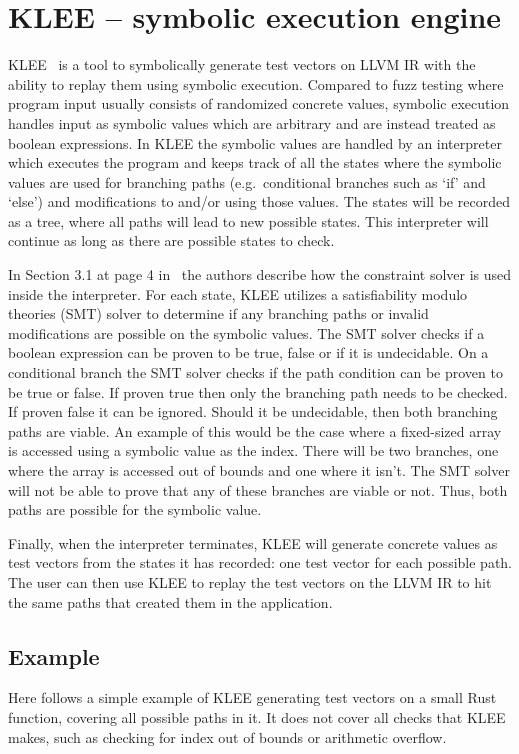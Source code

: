 \section{KLEE -- symbolic execution engine}
KLEE~\cite{kleepaper} is a tool to symbolically generate test vectors on LLVM IR with the
ability to replay them using symbolic execution. Compared to fuzz testing
where program input usually consists of randomized concrete values, symbolic
execution handles input as symbolic values which are arbitrary and are instead
treated as boolean expressions. In KLEE the symbolic values are handled by an
interpreter which executes the program and keeps track of all the states where
the symbolic values are used for branching paths (e.g.\ conditional branches
such as `if' and `else') and modifications to and/or using those values. The
states will be recorded as a tree, where all paths will lead to new possible
states.  This interpreter will continue as long as there are possible states to
check.

In Section 3.1 at page 4 in~\cite{kleepaper} the authors describe how the
constraint solver is used inside the interpreter. For each state, KLEE utilizes
a satisfiability modulo theories (SMT) solver to determine if any branching
paths or invalid modifications are possible on the symbolic values. The SMT
solver checks if a boolean expression can be proven to be true, false or if it
is undecidable. On a conditional branch the SMT solver checks if the path
condition can be proven to be true or false. If proven true then only the
branching path needs to be checked. If proven false it can be ignored. Should
it be undecidable, then both branching paths are viable. An example of this
would be the case where a fixed-sized array is accessed using a symbolic value
as the index. There will be two branches, one where the array is accessed out
of bounds and one where it isn't. The SMT solver will not be able to prove that
any of these branches are viable or not. Thus, both paths are possible for the
symbolic value.

Finally, when the interpreter terminates, KLEE will generate concrete values as
test vectors from the states it has recorded: one test vector for each possible
path. The user can then use KLEE to replay the test vectors on the LLVM IR to hit
the same paths that created them in the application.

\subsection{Example}
Here follows a simple example of KLEE generating test vectors on a small Rust
function, covering all possible paths in it. It does not cover all checks that
KLEE makes, such as checking for index out of bounds or arithmetic overflow.

